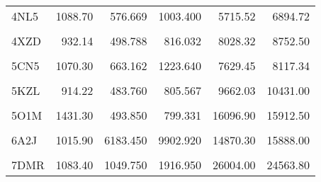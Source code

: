 \begin{table}[t!]
{\begin{tabular}{lrrrrr}
				\addlinespace
				4NL5 & 1088.70 & 576.669 & 1003.400 & 5715.52 & 6894.72\\
				\cellcolor{gray!6}{4UZV} & \cellcolor{gray!6}{1184.10} & \cellcolor{gray!6}{526.584} & \cellcolor{gray!6}{844.058} & \cellcolor{gray!6}{7378.28} & \cellcolor{gray!6}{8322.74}\\
				4XZD & 932.14 & 498.788 & 816.032 & 8028.32 & 8752.50\\
				\cellcolor{gray!6}{4Y1Q} & \cellcolor{gray!6}{952.23} & \cellcolor{gray!6}{494.939} & \cellcolor{gray!6}{806.960} & \cellcolor{gray!6}{7905.84} & \cellcolor{gray!6}{8785.04}\\
				5CN5 & 1070.30 & 663.162 & 1223.640 & 7629.45 & 8117.34\\
				\addlinespace
				\cellcolor{gray!6}{5GJ3} & \cellcolor{gray!6}{1108.20} & \cellcolor{gray!6}{756.603} & \cellcolor{gray!6}{1131.670} & \cellcolor{gray!6}{11394.00} & \cellcolor{gray!6}{12591.80}\\
				5KZL & 914.22 & 483.760 & 805.567 & 9662.03 & 10431.00\\
				\cellcolor{gray!6}{5O1L} & \cellcolor{gray!6}{1438.70} & \cellcolor{gray!6}{801.519} & \cellcolor{gray!6}{1447.270} & \cellcolor{gray!6}{15538.20} & \cellcolor{gray!6}{16876.00}\\
				5O1M & 1431.30 & 493.850 & 799.331 & 16096.90 & 15912.50\\
				\cellcolor{gray!6}{5VEU} & \cellcolor{gray!6}{964.76} & \cellcolor{gray!6}{993.578} & \cellcolor{gray!6}{1502.660} & \cellcolor{gray!6}{20900.80} & \cellcolor{gray!6}{20425.90}\\
				\addlinespace
				6A2J & 1015.90 & 6183.450 & 9902.920 & 14870.30 & 15888.00\\
				\cellcolor{gray!6}{7C74} & \cellcolor{gray!6}{1155.10} & \cellcolor{gray!6}{497.527} & \cellcolor{gray!6}{820.381} & \cellcolor{gray!6}{26111.40} & \cellcolor{gray!6}{25094.20}\\
				7DMR & 1083.40 & 1049.750 & 1916.950 & 26004.00 & 24563.80\\
				\bottomrule
		\end{tabular}}
	\end{table}
	
